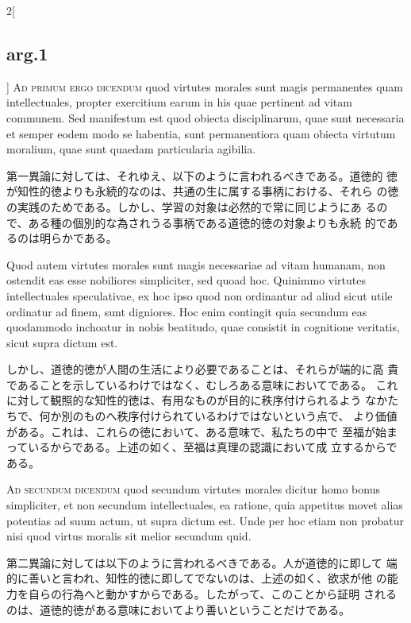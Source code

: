 \documentclass[paper=a4paper,fontsize=10pt,jafontsize=9pt,titlepage]{jlreq}
\begin{document}
\begin{paracol}{2}[\subsection{arg.1}]
{\scshape Ad primum ergo dicendum} quod virtutes morales sunt magis
 permanentes quam intellectuales, propter exercitium earum in his quae
 pertinent ad vitam communem. Sed manifestum est quod obiecta
 disciplinarum, quae sunt necessaria et semper eodem modo se habentia,
 sunt permanentiora quam obiecta virtutum moralium, quae sunt quaedam
 particularia agibilia.

\switchcolumn

第一異論に対しては、それゆえ、以下のように言われるべきである。道徳的
 徳が知性的徳よりも永続的なのは、共通の生に属する事柄における、それら
 の徳の実践のためである。しかし、学習の対象は必然的で常に同じようにあ
 るので、ある種の個別的な為されうる事柄である道徳的徳の対象よりも永続
 的であるのは明らかである。

\switchcolumn*

Quod autem virtutes morales sunt magis necessariae ad vitam humanam,
 non ostendit eas esse nobiliores simpliciter, sed quoad hoc. Quinimmo
 virtutes intellectuales speculativae, ex hoc ipso quod non ordinantur
 ad aliud sicut utile ordinatur ad finem, sunt digniores. Hoc enim
 contingit quia secundum eas quodammodo inchoatur in nobis beatitudo,
 quae consistit in cognitione veritatis, sicut supra dictum est.

\switchcolumn

しかし、道徳的徳が人間の生活により必要であることは、それらが端的に高
 貴であることを示しているわけではなく、むしろある意味においてである。
 これに対して観照的な知性的徳は、有用なものが目的に秩序付けられるよう
 なかたちで、何か別のものへ秩序付けられているわけではないという点で、
 より価値がある。これは、これらの徳において、ある意味で、私たちの中で
 至福が始まっているからである。上述の如く、至福は真理の認識において成
 立するからである。

\switchcolumn*[\subsection{ad.2}]

{\scshape Ad secundum dicendum} quod secundum virtutes morales dicitur
homo bonus simpliciter, et non secundum intellectuales, ea ratione,
quia appetitus movet alias potentias ad suum actum, ut supra dictum
est. Unde per hoc etiam non probatur nisi quod virtus moralis sit
melior secundum quid.

\switchcolumn

第二異論に対しては以下のように言われるべきである。人が道徳的に即して
 端的に善いと言われ、知性的徳に即してでないのは、上述の如く、欲求が他
 の能力を自らの行為へと動かすからである。したがって、このことから証明
 されるのは、道徳的徳がある意味においてより善いということだけである。


\end{paracol}
\end{document}
